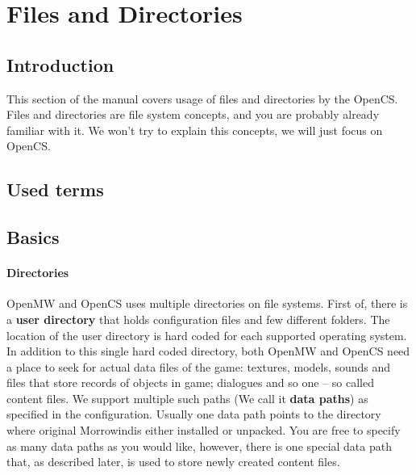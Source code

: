 \section{Files and Directories}
\subsection{Introduction}
This section of the manual covers usage of files and directories by the OpenCS. Files and directories are file system concepts, and you are probably already familiar with it. We won't try to explain this concepts, we will just focus on Open{CS}.

\subsection{Used terms} %

\subsection{Basics}

\paragraph{Directories}
Open{MW} and Open{CS} uses multiple directories on file systems. First of, there is a \textbf{user directory} that holds configuration files and few different folders. The location of the user directory is hard coded for each supported operating system.\\


In addition to this single hard coded directory, both Open{MW} and Open{CS} need a place to seek for actual data files of the game:  textures, models, sounds and files that store records of objects in game; dialogues and so one -- so called content files. We support multiple such paths (We call it \textbf{data paths}) as specified in the configuration. Usually one data path points to the directory where original Morrowind\texttrademark is either installed or unpacked. You are free to specify as many data paths as you would like, however, there is one special data path that, as described later, is used to store newly created content files.

